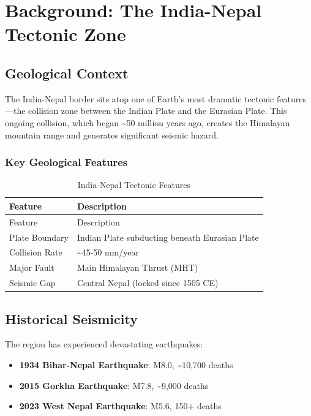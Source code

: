 \documentclass[
  11pt,
  a4paper,
  oneside,
  openany]{article}
\providecommand{\tightlist}{%
  \setlength{\itemsep}{0pt}\setlength{\parskip}{0pt}}\usepackage{longtable,booktabs,array}
\begin{document}
\section{Background: The India-Nepal Tectonic
Zone}\label{background-the-india-nepal-tectonic-zone}

\subsection{Geological Context}\label{geological-context}

The India-Nepal border sits atop one of Earth's most dramatic tectonic
features---the collision zone between the Indian Plate and the Eurasian
Plate. This ongoing collision, which began \textasciitilde50 million
years ago, creates the Himalayan mountain range and generates
significant seismic hazard.

\subsubsection{Key Geological Features}\label{key-geological-features}

\begin{longtable}[]{@{}ll@{}}
\caption{India-Nepal Tectonic
Features}\label{tbl-geology}\tabularnewline
\toprule\noalign{}
Feature & Description \\
\midrule\noalign{}
\endfirsthead
\toprule\noalign{}
Feature & Description \\
\midrule\noalign{}
\endhead
\bottomrule\noalign{}
\endlastfoot
Plate Boundary & Indian Plate subducting beneath Eurasian Plate \\
Collision Rate & \textasciitilde45-50 mm/year \\
Major Fault & Main Himalayan Thrust (MHT) \\
Seismic Gap & Central Nepal (locked since 1505 CE) \\
\end{longtable}

\subsection{Historical Seismicity}\label{historical-seismicity}

The region has experienced devastating earthquakes:

\begin{itemize}
\tightlist
\item
  \textbf{1934 Bihar-Nepal Earthquake}: M8.0, \textasciitilde10,700
  deaths
\item
  \textbf{2015 Gorkha Earthquake}: M7.8, \textasciitilde9,000 deaths
\item
  \textbf{2023 West Nepal Earthquake}: M5.6, 150+ deaths
\end{itemize}
\end{document}
